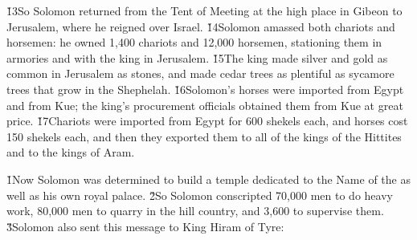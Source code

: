 \v{13}So Solomon returned from the Tent of Meeting at the high place in Gibeon to Jerusalem, where he reigned over Israel. \v{14}Solomon amassed both chariots and horsemen: he owned 1,400 chariots and 12,000 horsemen, stationing them in armories and with the king in Jerusalem. \v{15}The king made silver and gold as common in Jerusalem as stones, and made cedar trees as plentiful as sycamore trees that grow in the Shephelah. \v{16}Solomon's horses were imported from Egypt and from Kue; the king's procurement officials obtained them from Kue at great price. \v{17}Chariots were imported from Egypt for 600 shekels each, and horses cost 150 shekels each, and then they exported them to all of the kings of the Hittites and to the kings of Aram.

\v{1}Now Solomon was determined to build a temple dedicated to the Name of the  as well as his own royal palace. \v{2}So Solomon conscripted 70,000 men to do heavy work, 80,000 men to quarry in the hill country, and 3,600 to supervise them. \v{3}Solomon also sent this message to King Hiram of Tyre:

